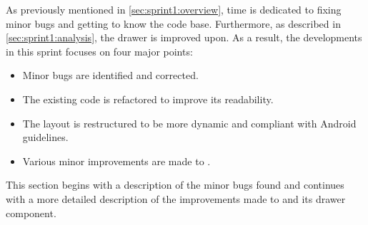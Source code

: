 As previously mentioned in \cref{sec:sprint1:overview}, time is dedicated to fixing minor bugs and getting to know the code base.
Furthermore, as described in \cref{sec:sprint1:analysis}, the drawer is improved upon.
As a result, the developments in this sprint focuses on four major points:

\begin{itemize}
\item Minor bugs are identified and corrected.
\item The existing code is refactored to improve its readability.
\item The layout is restructured to be more dynamic and compliant with Android guidelines.
\item Various minor improvements are made to \launcher.
\end{itemize}

This section begins with a description of the minor bugs found and continues with a more detailed description of the improvements made to \launcher and its drawer component.
